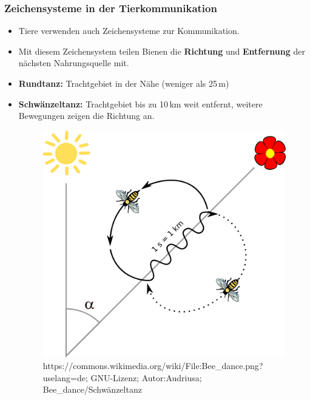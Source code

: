 \begin{frame}
\frametitle{Zeichensysteme in der Tierkommunikation}

\begin{itemize}
	\item<1-> Tiere verwenden auch Zeichensysteme zur Kommunikation.
\end{itemize}			
			




\begin{itemize}
	\item<2-> Mit diesem Zeichensystem teilen Bienen die \textbf{Richtung} und \textbf{Entfernung} der nächsten Nahrungsquelle mit. 
	\item<2-> \textbf{Rundtanz:} Trachtgebiet in der Nähe (weniger als 25\,m)
	\item<2-> \textbf{Schwänzeltanz:} Trachtgebiet bis zu 10\,km weit entfernt, weitere Bewegungen zeigen die Richtung an.

\begin{figure}[H]
\centering
\includegraphics[scale=0.14]{material/Bee-dance}
\caption{https://commons.wikimedia.org/wiki/File:Bee\_dance.png?uselang=de; GNU-Lizenz; Autor:Audriusa; Bee\_dance/Schwänzeltanz}
\label{Zeichen2}
\end{figure}

\end{itemize}		
		
\end{frame}			


